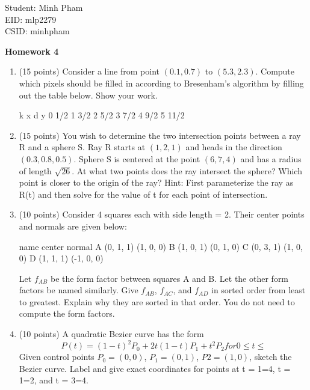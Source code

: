 \documentclass[12pt]{letter}
\begin{document}
Student: Minh Pham \\
EID: mlp2279 \\
CSID: minhpham

\begin{center}
	\textbf{Homework 4} \\
\end{center}

\begin{enumerate}
	\item (15 points)
	Consider a line from point $(0.1, 0.7)$ to $(5.3, 2.3)$. Compute which pixels should be filled in according to Bresenham's algorithm by filling out the table below. Show your work.
	
k x d y
0 1/2
1 3/2
2 5/2
3 7/2
4 9/2
5 11/2

	\item (15 points)
	You wish to determine the two intersection points between a ray R and a sphere S. Ray R starts at $(1, 2, 1)$ and heads in the direction $(0.3, 0.8, 0.5)$. Sphere S is centered at the point $(6, 7, 4)$ and has a radius of length $\sqrt{26}$. At what two points does the ray intersect the sphere? Which point is closer to the origin of the ray? Hint: First parameterize the ray as R(t) and then solve for the value of t for each point of intersection.

	\item (10 points) Consider 4 squares each with side length = 2. Their center points and normals are given below:
	
name center normal
A (0, 1, 1) (1, 0, 0)
B (1, 0, 1) (0, 1, 0)
C (0, 3, 1) (1, 0, 0)
D (1, 1, 1) (-1, 0, 0)

	Let $f_{AB}$ be the form factor between squares A and B. Let the other form factors be named similarly. Give $f_{AB}$, $f_{AC}$, and $f_{AD}$ in sorted order from least to greatest. Explain why they are sorted in that order. You do not need to compute the form factors.

	\item (10 points) A quadratic Bezier curve has the form
$$P(t) = (1 - t)^2P_0 + 2t(1 - t)P_1 + t^2P_2 for 0 \leq t \leq $$
	Given control points $P_0 = (0, 0)$, $P_1 = (0, 1)$, $P2 = (1, 0)$, sketch the Bezier curve. Label and give exact coordinates for points at t = 1=4, t = 1=2, and t = 3=4.

\end{enumerate}
\end{document}
